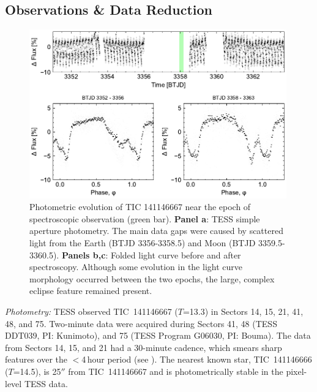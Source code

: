 \documentclass{nature3}
\begin{document}
\newpage
\begin{methods}

\renewcommand{\figurename}{Extended Data Figure}
\renewcommand{\tablename}{Extended Data Table}
\setcounter{table}{0}  
\setcounter{figure}{0}  

\subsection{Observations \& Data Reduction}\phantom{+}

\begin{figure}[!b]
  \centering
  \includegraphics[width=0.99\textwidth]{figures/sf1.pdf}
  \caption{Photometric evolution of TIC 141146667 near the epoch of
  spectroscopic observation (green bar). 
  {\bf Panel a}: TESS simple aperture photometry. 
  The main data gaps were caused by scattered light from the Earth
  (BTJD 3356-3358.5) and Moon (BTJD 3359.5-3360.5).
  {\bf Panels b,c}: Folded light curve before and after spectroscopy.
  Although some evolution in the light curve morphology occurred between
  the two epochs, the large, complex eclipse feature remained present.
  }
  \label{fig:fulllc}
\end{figure}

{\it Photometry:} TESS observed
TIC~141146667 ($T$=13.3) in Sectors 14, 15, 21, 41, 48, and 75.
Two-minute data were acquired during Sectors 41, 48 (TESS DDT039,
PI: Kunimoto), and 75 (TESS Program G06030, PI: Bouma).  The data
from Sectors 14, 15, and 21 had a 30-minute cadence, which
smears sharp features over the $<$4\,hour period
(see \cite{Gunther2022}).  The nearest known star, TIC~141146666
($T$=14.5), is 25$''$ from TIC~141146667 and is photometrically stable
in the pixel-level TESS data.


\end{methods}
\end{document}
